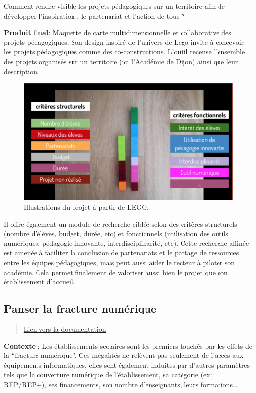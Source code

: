 \documentclass[]{book}
\begin{document}
Comment rendre visible les projets pédagogiques sur un territoire afin
de développer l'inspiration , le partenariat et l'action de tous ?

\textbf{Produit final}: Maquette de carte multidimensionnelle et
collaborative des projets pédagogiques. Son design inspiré de l'univers
de Lego invite à concevoir les projets pédagogiques comme des
co-constructions. L'outil recense l'ensemble des projets organisés sur
un territoire (ici l'Académie de Dijon) ainsi que leur description.

\begin{figure}

{\centering \includegraphics[width=0.7\linewidth]{./img/alainjette} 

}

\caption{Illustrations du projet à partir de LEGO.}\label{fig:unnamed-chunk-11}
\end{figure}

Il offre également un module de recherche ciblée selon des critères
structurels (nombre d'élèves, budget, durée, etc) et fonctionnels
(utilisation des outils numériques, pédagogie innovante,
interdisciplinarité, etc). Cette recherche affinée est amenée à
faciliter la conclusion de partenariats et le partage de ressources
entre les équipes pédagogiques, mais peut aussi aider le recteur à
piloter son académie. Cela permet finalement de valoriser aussi bien le
projet que son établissement d'accueil.

\subsection{Panser la fracture
numérique}\label{panser-la-fracture-numerique}

\begin{quote}
\href{https://drive.google.com/drive/folders/1dkZBb5xC6zCmAiD-EKUGl0TThzRDolEe}{Lien
vers la documentation}
\end{quote}

\textbf{Contexte} : Les établissements scolaires sont les premiers
touchés par les effets de la ``fracture numérique''. Ces inégalités ne
relèvent pas seulement de l'accès aux équipements informatiques, elles
sont également induites par d'autres paramètres tels que la couverture
numérique de l'établissement, sa catégorie (ex: REP/REP+), ses
financements, son nombre d'enseignants, leurs formations\ldots{}
\end{document}
